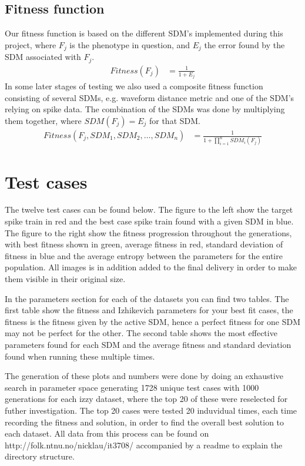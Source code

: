 \documentclass[10pt]{article}
\begin{document}
	\subsection{Fitness function}\label{sec:fitness}
		Our fitness function is based on the different SDM's implemented during this project, where $F_j$ is the phenotype in question, and $E_j$ the error found by the SDM associated with $F_j$.
		\begin{align}
			Fitness(F_j) &= \frac{1}{1+E_j}\nonumber
		\end{align}
		In some later stages of testing we also used a composite fitness function consisting of several SDMs, e.g. waveform distance metric and one of the SDM's relying on spike data. The combination of the SDMs was done by multiplying them together, where $SDM(F_j) = E_j$ for that SDM.
		\begin{align}
			Fitness(F_j, SDM_1, SDM_2, \ldots,SDM_n) &= \frac{1}{1+\prod_{i=1}^nSDM_i(F_j)}\nonumber
		\end{align}
\pagebreak
\section{Test cases}\label{sec:test}
	The twelve test cases can be found below. The figure to the left show the target spike train in red and the best case spike train found with a given SDM in blue. The figure to the right show the fitness progression throughout the generations, with best fitness shown in green, average fitness in red, standard deviation of fitness in blue and the average entropy between the parameters for the entire population. All images is in addition added to the final delivery in order to make them visible in their original size. 
	
	In the parameters section for each of the datasets you can find two tables. The first table show the fitness and Izhikevich parameters for your best fit cases, the fitness is the fitness given by the active SDM, hence a perfect fitness for one SDM may not be perfect for the other. The second table shows the most effective parameters found for each SDM and the average fitness and standard deviation found when running these multiple times. 
	
	The generation of these plots and numbers were done by doing an exhaustive search in parameter space generating 1728 unique test cases with 1000 generations for each izzy dataset, where the top 20 of these were reselected for futher investigation. The top 20 cases were tested 20 induvidual times, each time recording the fitness and solution, in order to find the overall best solution to each dataset. All data from this process can be found on http://folk.ntnu.no/nicklau/it3708/ accompanied by a readme to explain the directory structure.
	
\end{document}
